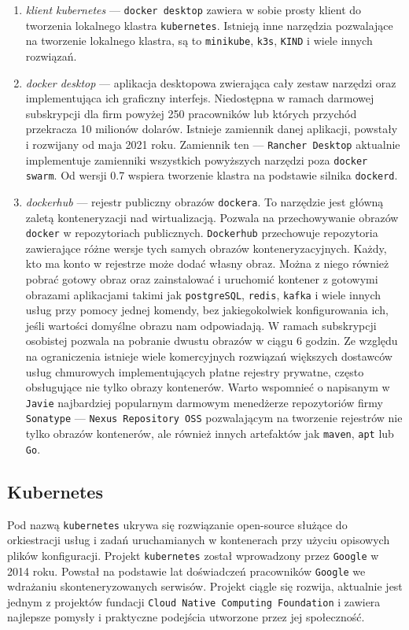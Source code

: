 \documentclass[12pt,twoside]{article}
\begin{document}
\begin{enumerate}[label=\arabic*), leftmargin=1.25cm]
\item \textit{klient kubernetes} — \texttt{docker desktop} zawiera w sobie prosty klient do tworzenia lokalnego klastra \texttt{kubernetes}. Istnieją inne narzędzia pozwalające na tworzenie lokalnego klastra, są to \texttt{minikube}, \texttt{k3s}, \texttt{KIND} i wiele innych rozwiązań.
\item \textit{docker desktop} — aplikacja desktopowa zwierająca cały zestaw narzędzi oraz implementująca ich graficzny interfejs. Niedostępna w ramach darmowej subskrypcji dla firm powyżej 250 pracowników lub których przychód przekracza 10 milionów dolarów. Istnieje zamiennik danej aplikacji, powstały i rozwijany od maja 2021 roku. Zamiennik ten — \texttt{Rancher Desktop} aktualnie implementuje zamienniki wszystkich powyższych narzędzi poza \texttt{docker swarm}. Od wersji 0.7 wspiera tworzenie klastra na podstawie silnika  \texttt{dockerd}.
\item \textit{dockerhub} — rejestr publiczny obrazów \texttt{dockera}. To narzędzie jest główną zaletą konteneryzacji nad wirtualizacją. Pozwala na przechowywanie obrazów \texttt{docker} w repozytoriach publicznych. \texttt{Dockerhub} przechowuje repozytoria zawierające różne wersje tych samych obrazów konteneryzacyjnych. Każdy, kto ma konto w rejestrze może dodać własny obraz. Można z niego również pobrać gotowy obraz oraz zainstalować i uruchomić kontener z gotowymi obrazami aplikacjami takimi jak \texttt{postgreSQL}, \texttt{redis}, \texttt{kafka} i wiele innych usług przy pomocy jednej komendy, bez jakiegokolwiek konfigurowania ich, jeśli wartości domyślne obrazu nam odpowiadają. W ramach subskrypcji osobistej pozwala na pobranie dwustu obrazów w ciągu 6 godzin. Ze względu na ograniczenia istnieje wiele komercyjnych rozwiązań większych dostawców usług chmurowych implementujących płatne rejestry prywatne, często obsługujące nie tylko obrazy kontenerów. Warto wspomnieć o napisanym w \texttt{Javie} najbardziej popularnym darmowym menedżerze repozytoriów firmy \texttt{Sonatype} — \texttt{Nexus Repository OSS} pozwalającym na tworzenie rejestrów nie tylko obrazów kontenerów, ale również innych artefaktów jak \texttt{maven},  \texttt{apt} lub \texttt{Go}\cite{registry}.
\end{enumerate}

\subsection{Kubernetes}

Pod nazwą \texttt{kubernetes} ukrywa się rozwiązanie open-source służące do orkiestracji usług i zadań uruchamianych w kontenerach przy użyciu opisowych plików konfiguracji. Projekt \texttt{kubernetes} został wprowadzony przez \texttt{Google} w 2014 roku. Powstał na podstawie lat doświadczeń pracowników \texttt{Google} we wdrażaniu skonteneryzowanych serwisów. Projekt ciągle się rozwija, aktualnie jest jednym z projektów fundacji \texttt{Cloud Native Computing Foundation} i zawiera najlepsze pomysły i praktyczne podejścia utworzone przez jej społeczność\cite{kubernetes}.
\end{document}
